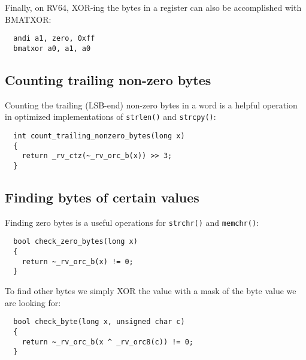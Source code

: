 Finally, on RV64, XOR-ing the bytes in a register can also be accomplished with BMATXOR:

\begin{minipage}{\linewidth}
\begin{verbatim}
  andi a1, zero, 0xff
  bmatxor a0, a1, a0
\end{verbatim}
\end{minipage}


\subsection{Counting trailing non-zero bytes}

Counting the trailing (LSB-end) non-zero bytes in a word
is a helpful operation in optimized implementations of {\tt strlen()}
and {\tt strcpy()}:

\begin{minipage}{\linewidth}
\begin{verbatim}
  int count_trailing_nonzero_bytes(long x)
  {
    return _rv_ctz(~_rv_orc_b(x)) >> 3;
  }
\end{verbatim}
\end{minipage}


\subsection{Finding bytes of certain values}

Finding zero bytes is a useful operations for {\tt strchr()}
and {\tt memchr()}:

\begin{minipage}{\linewidth}
\begin{verbatim}
  bool check_zero_bytes(long x)
  {
    return ~_rv_orc_b(x) != 0;
  }
\end{verbatim}
\end{minipage}

To find other bytes we simply XOR the value with a mask of the byte value we
are looking for:

\begin{minipage}{\linewidth}
\begin{verbatim}
  bool check_byte(long x, unsigned char c)
  {
    return ~_rv_orc_b(x ^ _rv_orc8(c)) != 0;
  }
\end{verbatim}
\end{minipage}

